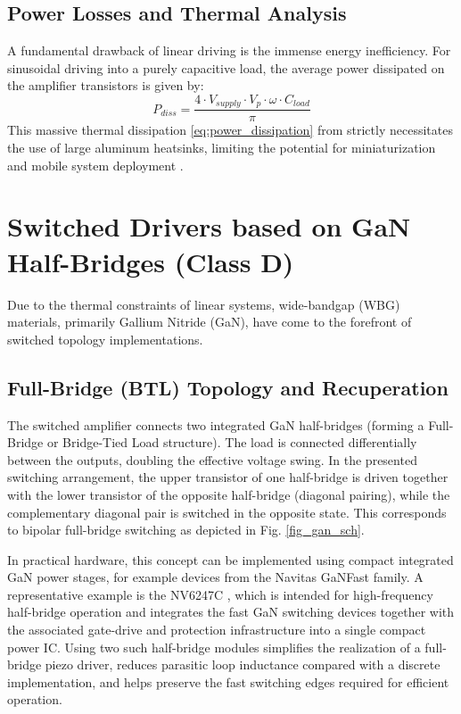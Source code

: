 \documentclass[10pt, conference, letterpaper]{IEEEtran}
\begin{document}
\subsection{Power Losses and Thermal Analysis}
A fundamental drawback of linear driving is the immense energy inefficiency. For sinusoidal driving into a purely capacitive load, the average power dissipated on the amplifier transistors is given by:
\begin{equation}
P_{diss} = \frac{4 \cdot V_{supply} \cdot V_{p} \cdot \omega \cdot C_{load}}{\pi}
\label{eq:power_dissipation}
\end{equation}
This massive thermal dissipation  \eqref{eq:power_dissipation} from strictly necessitates the use of large aluminum heatsinks, limiting the potential for miniaturization and mobile system deployment \cite{apex_linear}.

\section{Switched Drivers based on GaN Half-Bridges (Class D)}
Due to the thermal constraints of linear systems, wide-bandgap (WBG) materials, primarily Gallium Nitride (GaN), have come to the forefront of switched topology implementations.

\subsection{Full-Bridge (BTL) Topology and Recuperation}
The switched amplifier connects two integrated GaN half-bridges (forming a Full-Bridge or Bridge-Tied Load structure). The load is connected differentially between the outputs, doubling the effective voltage swing.
In the presented switching arrangement, the upper transistor of one half-bridge is driven together with the lower transistor of the opposite half-bridge (diagonal pairing), while the complementary diagonal pair is switched in the opposite state. This corresponds to bipolar full-bridge switching as depicted in Fig. \ref{fig_gan_sch}.

In practical hardware, this concept can be implemented using compact integrated GaN power stages, for example devices from the Navitas GaNFast family. A representative example is the NV6247C \cite{navitas_nv6247c}, which is intended for high-frequency half-bridge operation and integrates the fast GaN switching devices together with the associated gate-drive and protection infrastructure into a single compact power IC. Using two such half-bridge modules simplifies the realization of a full-bridge piezo driver, reduces parasitic loop inductance compared with a discrete implementation, and helps preserve the fast switching edges required for efficient operation.
\end{document}
